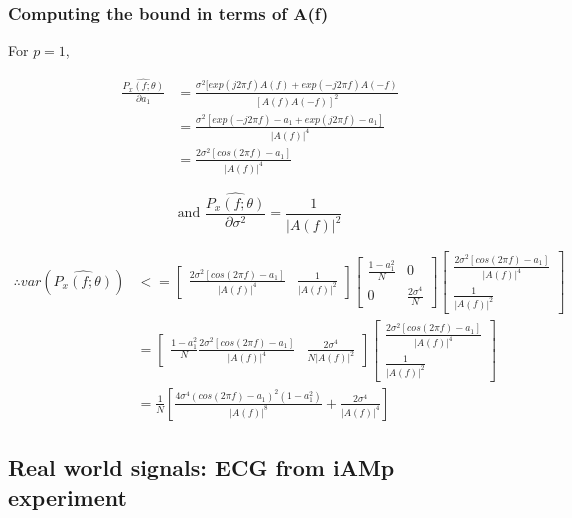 \subsubsection{Computing the bound in terms of A(f)}

For $p=1$,

\begin{align}
\frac{\hat{P_x(f;\theta)}}{\partial a_1} &= \frac{\sigma^2 [exp(j2\pi f)A(f) + exp(-j2\pi f)A(-f)}{[A(f)A(-f)]^2} \\
&= \frac{\sigma^2 [exp(-j2\pi f) - a_1 + exp(j2\pi f) - a_1]}{|A(f)|^4} \\
&= \frac{2\sigma^2[cos(2\pi f) - a_1]}{|A(f)|^4}
\end{align}

\begin{equation}
\text{and } \frac{\hat{P_x(f;\theta)}}{\partial \sigma^2} = \frac{1}{|A(f)|^2}
\end{equation}

\begin{align}
\therefore var(\hat{P_x(f;\theta)}) &<=
\begin{bmatrix}
\frac{2\sigma^2[cos(2\pi f) - a_1]}{|A(f)|^4} & \frac{1}{|A(f)|^2}
\end{bmatrix}
\begin{bmatrix}
\frac{1-a_1^2}{N} & 0 \\
0 & \frac{2\sigma^4}{N}
\end{bmatrix}
\begin{bmatrix}
\frac{2\sigma^2[cos(2\pi f) - a_1]}{|A(f)|^4} \\
\frac{1}{|A(f)|^2}
\end{bmatrix}
\\
&=
\begin{bmatrix}
\frac{1-a_1^2}{N} \frac{2\sigma^2[cos(2\pi f) - a_1]}{|A(f)|^4} & \frac{2\sigma^4}{N |A(f)|^2}
\end{bmatrix}
\begin{bmatrix}
\frac{2\sigma^2[cos(2\pi f) - a_1]}{|A(f)|^4} \\
\frac{1}{|A(f)|^2}
\end{bmatrix}
\\
&=\frac{1}{N} [\frac{4\sigma^4 (cos(2\pi f) - a_1)^2(1-a_1^2)}{|A(f)|^8} + \frac{2\sigma^4}{|A(f)|^4}]
\end{align}


\pagebreak

\subsection{Real world signals: ECG from iAMp experiment}

